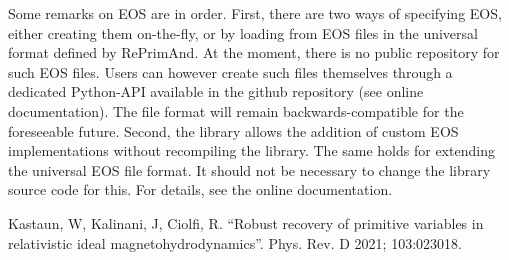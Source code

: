 Some remarks on EOS are in order. 
First, there are two ways of specifying EOS, either creating them on-the-fly, or by loading 
from EOS files in the universal format defined by RePrimAnd. At the moment, there is no public repository 
for such EOS files. Users can however create such files themselves through a dedicated Python-API available in the 
github repository (see online documentation). The file format will remain backwards-compatible for the foreseeable future.
Second, the library allows the addition of custom EOS implementations without recompiling the library.
The same holds for extending the universal EOS file format. It should not be necessary to change the library 
source code for this. For details, see the online documentation.

\begin{thebibliography}{9}
Kastaun, W, Kalinani, J, Ciolfi, R. ``Robust recovery of primitive variables in
relativistic ideal magnetohydrodynamics''. Phys. Rev. D 2021; 103:023018.
\end{thebibliography}



